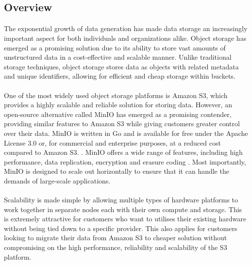 \documentclass[12pt, conference, final, a4paper, onecolumn, compsoc]{IEEEtran}
\begin{document}
    \subsection*{Overview}
    \paragraph{} %
    The exponential growth of data generation has made data storage an
    increasingly important aspect for both individuals and organizations alike.
    Object storage has emerged as a promising solution due to its ability to
    store vast amounts of unstructured data in a cost-effective and scalable
    manner. Unlike traditional storage techniques, object storage stores data as
    objects with related metadata and unique identifiers, allowing for efficient
    and cheap storage within buckets.


    \paragraph{} %
    One of the most widely used object storage platforms is Amazon S3, which
    provides a highly scalable and reliable solution for storing data. However,
    an open-source alternative called MinIO has emerged as a promising
    contender, providing similar features to Amazon S3 while giving customers
    greater control over their data. MinIO is written in Go and is available for
    free under the Apache License 3.0 or, for commercial and enterprise
    purposes, at a reduced cost compared to Amazon S3. \citep{minio-pricing}.
    MinIO offers a wide range of features, including high performance, data
    replication, encryption and erasure coding \citep{minio}. Most importantly,
    MinIO is designed to scale out horizontally to ensure that it can handle the
    demands of large-scale applications.

    \paragraph{} %
    Scalability is made simple by allowing multiple types of hardware platforms
    to work together in separate nodes each with their own compute and storage.
    This is extremely attractive for customers who want to utilises their
    existing hardware without being tied down to a specific provider. This also
    applies for customers looking to migrate their data from Amazon S3 to
    cheaper solution without compromising on the high performance, reliability
    and scalability of the S3 platform.
\end{document}
